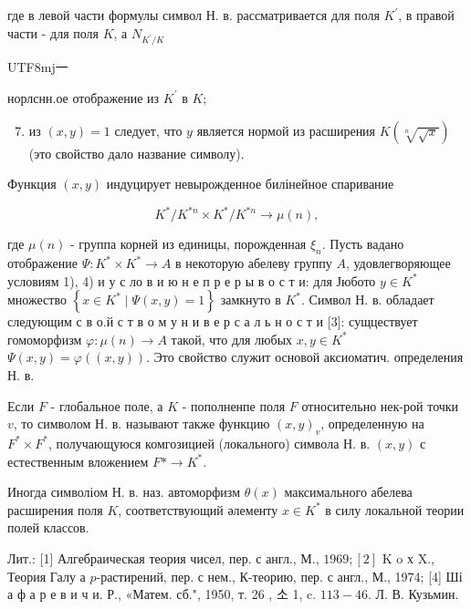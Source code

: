 \documentclass[10pt]{article}
\begin{document}
где в левой части формулы символ Н. в. рассматривается для поля $K^{\prime}$, в правой части - для поля $K$, а $N_{K^{\prime} / K}$ \begin{CJK}{UTF8}{mj}一\end{CJK}норлснн.ое отображение из $K^{\prime}$ в $K$;



\begin{enumerate}

  \setcounter{enumi}{6}

  \item из $(x, y)=1$ следует, что $y$ является нормой из расширения $K(\sqrt[n]{\sqrt{x}})$ (это свойство дало название символу).

\end{enumerate}



Функция $(x, y)$ индуцирует невырожденное билінейное спаривание



\[

K^{*} / K^{* n} \times K^{*} / K^{* n} \rightarrow \mu(n),

\]



где $\mu(n)$ - группа корней из единицы, порожденная $\xi_{n}$. Пусть вадано отображение $\Psi: K^{*} \times K^{*} \rightarrow A$ в некоторую абелеву группу $A$, удовлегворяющее условиям 1), 4) и у с ло в и ю н е п р е р ы в о с т и: для Јюбото $y \in K^{*}$ множество $\left\{x \in K^{*} \mid \Psi(x, y)=1\right\}$ замкнуто в $K^{*}$. Символ Н. в. обладает следующим с в о.й с т в о м у н и в е р с а л ь н о с т и [3]: сущцествует гомоморфизм $\varphi: \mu(n) \rightarrow A$ такой, что для любых $x, y \in K^{*}$ $\Psi(x, y)=\varphi((x, y))$. Это свойство служит основой аксиоматич. определения Н. в.



Если $F$ - глобальное поле, а $K$ - пополненпе поля $F$ относительно нек-рой точки $v$, то символом Н. в. называют также функцию $(x, y)_{v}$, определенную на $F^{*} \times F^{*}$, получающуюся комгозицией (локального) символа Н. в. $(x, y)$ с естественным вложением $F * \rightarrow K^{*}$.



Иногда символіом Н. в. наз. автоморфизм $\theta(x)$ максимального абелева расширения поля $K$, соответствующий әлементу $x \in K^{*}$ в силу локальной теории полей классов.



Лит.: [1] Алгебраическая теория чисел, пер. с англ., М., $1969 ;[2]$ K o х X., Теория Галу а $p$-растирений, пер. с нем., К-теорию, пер. с англ., М., 1974; [4] Ші а ф а р е в и ч и. Р., «Матем. сб.", 1950, т. 26 , 소 1, c. $113-46$. Л. В. Кузьмин.
\end{document}
